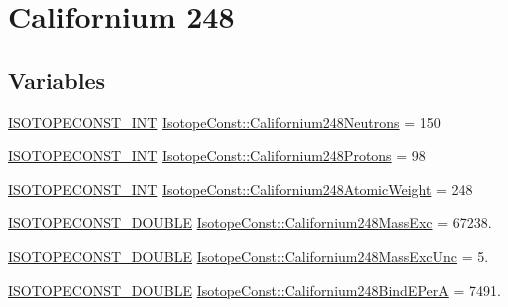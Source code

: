 \hypertarget{group___isotope_const-_californium-_cf248}{}\section{Californium 248}
\label{group___isotope_const-_californium-_cf248}
\subsection*{Variables}
\begin{DoxyCompactItemize}
\item 
\mbox{\hyperlink{group___isotope_const-_macros_ga5f18360b3e99483a35c32d789e62621c}{I\+S\+O\+T\+O\+P\+E\+C\+O\+N\+S\+T\+\_\+\+I\+NT}} \mbox{\hyperlink{group___isotope_const-_californium-_cf248_ga33b64787e9b62720b264f530ac8deaf5}{Isotope\+Const\+::\+Californium248\+Neutrons}} = 150
\item 
\mbox{\hyperlink{group___isotope_const-_macros_ga5f18360b3e99483a35c32d789e62621c}{I\+S\+O\+T\+O\+P\+E\+C\+O\+N\+S\+T\+\_\+\+I\+NT}} \mbox{\hyperlink{group___isotope_const-_californium-_cf248_ga7a99ffedaa2aa91e15e846e651973777}{Isotope\+Const\+::\+Californium248\+Protons}} = 98
\item 
\mbox{\hyperlink{group___isotope_const-_macros_ga5f18360b3e99483a35c32d789e62621c}{I\+S\+O\+T\+O\+P\+E\+C\+O\+N\+S\+T\+\_\+\+I\+NT}} \mbox{\hyperlink{group___isotope_const-_californium-_cf248_ga7088e1f286e7d652cea5d9141ddc1b3b}{Isotope\+Const\+::\+Californium248\+Atomic\+Weight}} = 248
\item 
\mbox{\hyperlink{group___isotope_const-_macros_ga8f45a7272ce02c0b4c65c44636ed719a}{I\+S\+O\+T\+O\+P\+E\+C\+O\+N\+S\+T\+\_\+\+D\+O\+U\+B\+LE}} \mbox{\hyperlink{group___isotope_const-_californium-_cf248_gabc69e5688f8abd819ab357e6d2614910}{Isotope\+Const\+::\+Californium248\+Mass\+Exc}} = 67238.
\item 
\mbox{\hyperlink{group___isotope_const-_macros_ga8f45a7272ce02c0b4c65c44636ed719a}{I\+S\+O\+T\+O\+P\+E\+C\+O\+N\+S\+T\+\_\+\+D\+O\+U\+B\+LE}} \mbox{\hyperlink{group___isotope_const-_californium-_cf248_ga1236f933f9aac71416476121cdab71e8}{Isotope\+Const\+::\+Californium248\+Mass\+Exc\+Unc}} = 5.
\item 
\mbox{\hyperlink{group___isotope_const-_macros_ga8f45a7272ce02c0b4c65c44636ed719a}{I\+S\+O\+T\+O\+P\+E\+C\+O\+N\+S\+T\+\_\+\+D\+O\+U\+B\+LE}} \mbox{\hyperlink{group___isotope_const-_californium-_cf248_ga554d3d907fa7b3a19a3105beb87daeea}{Isotope\+Const\+::\+Californium248\+Bind\+E\+PerA}} = 7491.

\end{DoxyCompactItemize}
